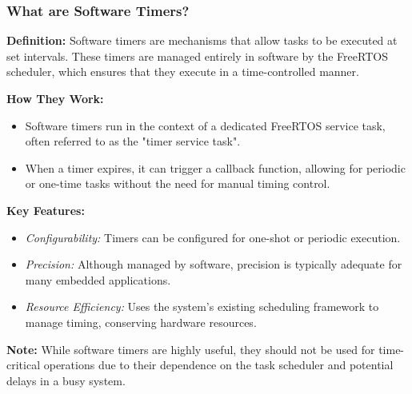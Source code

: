 \documentclass[10pt]{beamer}
\begin{document}
\begin{frame}
    \frametitle{What are Software Timers?}
  
    \textbf{Definition:}
    Software timers are mechanisms that allow tasks to be executed at set intervals. These timers are managed entirely in software by the FreeRTOS scheduler, which ensures that they execute in a time-controlled manner.
  
    \textbf{How They Work:}
    \begin{itemize}
      \item Software timers run in the context of a dedicated FreeRTOS service task, often referred to as the "timer service task".
      \item When a timer expires, it can trigger a callback function, allowing for periodic or one-time tasks without the need for manual timing control.
    \end{itemize}
  
\end{frame}

\begin{frame}
    \textbf{Key Features:}
    \begin{itemize}
      \item \textit{Configurability:} Timers can be configured for one-shot or periodic execution.
      \item \textit{Precision:} Although managed by software, precision is typically adequate for many embedded applications.
      \item \textit{Resource Efficiency:} Uses the system's existing scheduling framework to manage timing, conserving hardware resources.
    \end{itemize}

    \textbf{Note:}
    While software timers are highly useful, they should not be used for time-critical operations due to their dependence on the task scheduler and potential delays in a busy system.
\end{frame}
\end{document}
